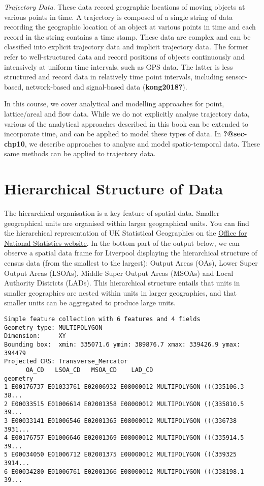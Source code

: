\documentclass[
  letterpaper,
  krantz2]{style/krantz}
\begin{document}
\emph{Trajectory Data}. These data record geographic locations of moving
objects at various points in time. A trajectory is composed of a single
string of data recording the geographic location of an object at various
points in time and each record in the string contains a time stamp.
These data are complex and can be classified into explicit trajectory
data and implicit trajectory data. The former refer to well-structured
data and record positions of objects continuously and intensively at
uniform time intervals, such as GPS data. The latter is less structured
and record data in relatively time point intervals, including
sensor-based, network-based and signal-based data (\textbf{kong2018?}).

In this course, we cover analytical and modelling approaches for point,
lattice/areal and flow data. While we do not explicitly analyse
trajectory data, various of the analytical approaches described in this
book can be extended to incorporate time, and can be applied to model
these types of data. In \textbf{?@sec-chp10}, we describe approaches to
analyse and model spatio-temporal data. These same methods can be
applied to trajectory data.

\hypertarget{hierarchical-structure-of-data}{%
\section{Hierarchical Structure of
Data}\label{hierarchical-structure-of-data}}

The hierarchical organisation is a key feature of spatial data. Smaller
geographical units are organised within larger geographical units. You
can find the hierarchical representation of UK Statistical Geographies
on the
\href{https://geoportal.statistics.gov.uk/search?collection=Document\&sort=name\&tags=all(DOC_HRSG\%2CDEC_2020)}{Office
for National Statistics website}. In the bottom part of the output
below, we can observe a spatial data frame for Liverpool displaying the
hierarchical structure of census data (from the smallest to the
largest): Output Areas (OAs), Lower Super Output Areas (LSOAs), Middle
Super Output Areas (MSOAs) and Local Authority Districts (LADs). This
hierarchical structure entails that units in smaller geographies are
nested within units in larger geographies, and that smaller units can be
aggregated to produce large units.

\begin{verbatim}
Simple feature collection with 6 features and 4 fields
Geometry type: MULTIPOLYGON
Dimension:     XY
Bounding box:  xmin: 335071.6 ymin: 389876.7 xmax: 339426.9 ymax: 394479
Projected CRS: Transverse_Mercator
      OA_CD   LSOA_CD   MSOA_CD    LAD_CD                       geometry
1 E00176737 E01033761 E02006932 E08000012 MULTIPOLYGON (((335106.3 38...
2 E00033515 E01006614 E02001358 E08000012 MULTIPOLYGON (((335810.5 39...
3 E00033141 E01006546 E02001365 E08000012 MULTIPOLYGON (((336738 3931...
4 E00176757 E01006646 E02001369 E08000012 MULTIPOLYGON (((335914.5 39...
5 E00034050 E01006712 E02001375 E08000012 MULTIPOLYGON (((339325 3914...
6 E00034280 E01006761 E02001366 E08000012 MULTIPOLYGON (((338198.1 39...
\end{verbatim}
\end{document}
